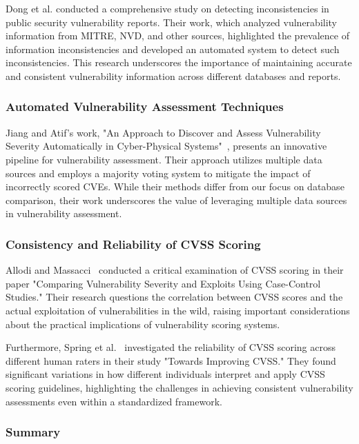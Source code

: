 \documentclass[12pt]{article}
\begin{document}
Dong et al.\@\cite{dong} conducted a comprehensive study on detecting inconsistencies in public security
vulnerability reports. Their work, which analyzed vulnerability information from MITRE, NVD, and other
sources, highlighted the prevalence of information inconsistencies and developed an automated system
to detect such inconsistencies. This research underscores the importance of maintaining accurate and
consistent vulnerability information across different databases and reports.

\subsubsection*{Automated Vulnerability Assessment Techniques}

Jiang and Atif's work, "An Approach to Discover and Assess Vulnerability Severity Automatically in
Cyber-Physical Systems"~\cite{jiang}, presents an innovative pipeline for vulnerability assessment.
Their approach utilizes multiple data sources and employs a majority voting system to mitigate the
impact of incorrectly scored CVEs. While their methods differ from our focus on database comparison,
their work underscores the value of leveraging multiple data sources in vulnerability assessment.


\subsubsection*{Consistency and Reliability of CVSS Scoring}

Allodi and Massacci~\cite{allodi} conducted a critical examination of CVSS scoring in their paper
"Comparing Vulnerability Severity and Exploits Using Case-Control Studies." Their research questions
the correlation between CVSS scores and the actual exploitation of vulnerabilities in the wild,
raising important considerations about the practical implications of vulnerability scoring systems.

Furthermore, Spring et al.~\cite{improving_cvss} investigated the reliability of CVSS scoring across
different human raters in their study "Towards Improving CVSS." They found significant variations in
how different individuals interpret and apply CVSS scoring guidelines, highlighting the challenges
in achieving consistent vulnerability assessments even within a standardized framework.

\subsubsection*{Summary}
\end{document}
